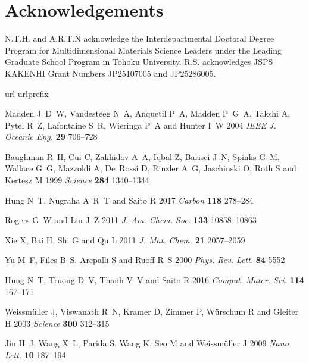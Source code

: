 \documentclass[12pt]{iopart}
\begin{document}
\section{Acknowledgements}
N.T.H. and A.R.T.N acknowledge the Interdepartmental Doctoral Degree
Program for Multidimensional Materials Science Leaders under the
Leading Graduate School Program in Tohoku
University. R.S. acknowledges JSPS KAKENHI Grant Numbers JP25107005
and JP25286005.

%

\begin{thebibliography}{10}
\expandafter\ifx\csname url\endcsname\relax
  \def\url#1{{\tt #1}}\fi
\expandafter\ifx\csname urlprefix\endcsname\relax\def\urlprefix{URL }\fi
\providecommand{\eprint}[2][]{\url{#2}}

Madden J~D~W, Vandesteeg N~A, Anquetil P~A, Madden P~G~A, Takshi A, Pytel R~Z,
  Lafontaine S~R, Wieringa P~A and Hunter I~W 2004 {\em IEEE J. Oceanic Eng.\/}
  {\bf 29} 706--728

Baughman R~H, Cui C, Zakhidov A~A, Iqbal Z, Barisci J~N, Spinks G~M, Wallace
  G~G, Mazzoldi A, De~Rossi D, Rinzler A~G, Jaschinski O, Roth S and Kertesz M
  1999 {\em Science\/} {\bf 284} 1340--1344

Hung N~T, Nugraha A~R~T and Saito R 2017 {\em Carbon\/} {\bf 118} 278--284

Rogers G~W and Liu J~Z 2011 {\em J. Am. Chem. Soc.\/} {\bf 133} 10858--10863

Xie X, Bai H, Shi G and Qu L 2011 {\em J. Mat. Chem.\/} {\bf 21} 2057--2059

Yu M~F, Files B~S, Arepalli S and Ruoff R~S 2000 {\em Phys. Rev. Lett.\/} {\bf
  84} 5552

Hung N~T, Truong D~V, Thanh V~V and Saito R 2016 {\em Comput. Mater. Sci.\/}
  {\bf 114} 167--171

Weissm{\"u}ller J, Viswanath R~N, Kramer D, Zimmer P, W{\"u}rschum R and
  Gleiter H 2003 {\em Science\/} {\bf 300} 312--315

Jin H~J, Wang X~L, Parida S, Wang K, Seo M and Weissm{\"u}ller J 2009 {\em Nano
  Lett.\/} {\bf 10} 187--194


\end{thebibliography}
\end{document}
